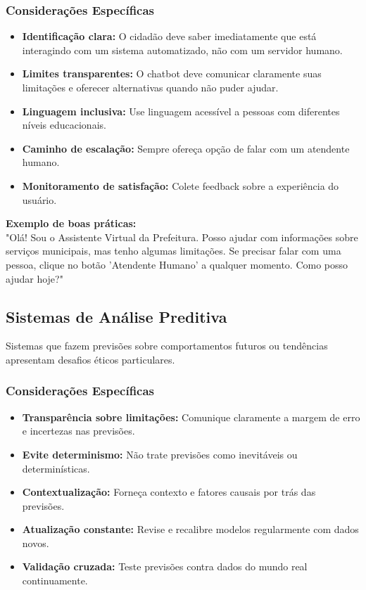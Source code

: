 \documentclass[12pt,a4paper]{article}
\begin{document}
\subsubsection{Considerações Específicas}
\begin{itemize}
    \item \textbf{Identificação clara:} O cidadão deve saber imediatamente que está interagindo com um sistema automatizado, não com um servidor humano.
    \item \textbf{Limites transparentes:} O chatbot deve comunicar claramente suas limitações e oferecer alternativas quando não puder ajudar.
    \item \textbf{Linguagem inclusiva:} Use linguagem acessível a pessoas com diferentes níveis educacionais.
    \item \textbf{Caminho de escalação:} Sempre ofereça opção de falar com um atendente humano.
    \item \textbf{Monitoramento de satisfação:} Colete feedback sobre a experiência do usuário.
\end{itemize}

\begin{tcolorbox}[example]
\textbf{Exemplo de boas práticas:} \\
"Olá! Sou o Assistente Virtual da Prefeitura. Posso ajudar com informações sobre serviços municipais, mas tenho algumas limitações. Se precisar falar com uma pessoa, clique no botão 'Atendente Humano' a qualquer momento. Como posso ajudar hoje?"
\end{tcolorbox}

\subsection{Sistemas de Análise Preditiva}

Sistemas que fazem previsões sobre comportamentos futuros ou tendências apresentam desafios éticos particulares.

\subsubsection{Considerações Específicas}
\begin{itemize}
    \item \textbf{Transparência sobre limitações:} Comunique claramente a margem de erro e incertezas nas previsões.
    \item \textbf{Evite determinismo:} Não trate previsões como inevitáveis ou determinísticas.
    \item \textbf{Contextualização:} Forneça contexto e fatores causais por trás das previsões.
    \item \textbf{Atualização constante:} Revise e recalibre modelos regularmente com dados novos.
    \item \textbf{Validação cruzada:} Teste previsões contra dados do mundo real continuamente.
\end{itemize}
\end{document}

